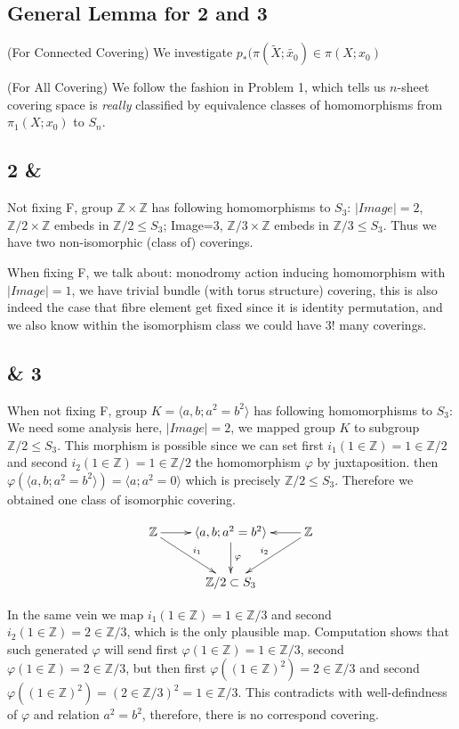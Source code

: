 \documentclass[11pt]{article}
\def\Z{{\mathbb Z}}
\theoremstyle{remark}
\begin{document}
\subsection*{General Lemma for 2 and 3}
  \indent (For Connected Covering) We investigate $p_*(\pi(\tilde{X};\tilde{x_0})\in \pi(X;x_0)$
  
  (For All Covering) We follow the fashion in Problem 1,  which tells us $n$-sheet covering space is \textit{really} classified by equivalence classes of homomorphisms from $\pi_1(X;x_0)$ to $S_n$. 
\subsection*{2 & }
    
    Not fixing F, group $\Z\times\Z$ has following homomorphisms to $S_3$: $|Image|=2$, $\Z/2\times\Z$ embeds in $\Z/2 \leq S_3$; Image=3, $\Z/3\times\Z$ embeds in $\Z/3 \leq S_3$. Thus we have two non-isomorphic (class of) coverings.  
    
    When fixing F, we talk about: monodromy action inducing homomorphism with $|Image|=1$, we have trivial bundle (with torus structure) covering, this is also indeed the case that fibre element get fixed since it is identity permutation, and we also know within the isomorphism class we could have $3!$ many coverings. 
    
\subsection*{ & 3}    
    
    When not fixing F, group $K=\langle a,b; a^2=b^2 \rangle$ has following homomorphisms to $S_3$: We need some analysis here, $|Image|=2$, we mapped group $K$ to subgroup  $\Z/2 \leq S_3$. This morphism is possible since we can set first $i_1(1\in \Z)=1\in \Z/2$ and second $i_2(1\in \Z)=1\in \Z/2$ the homomorphism $\varphi$ by juxtaposition. then $\varphi(\langle a,b; a^2=b^2 \rangle)=\langle a; a^2=0 \rangle$ which is precisely $\Z/2 \leq S_3$. Therefore we obtained one class of isomorphic covering. 
    
    \[
    \xymatrix{
    \Z \ar[r]^{}\ar[dr]^{i_1} & \langle a,b; a^2=b^2 \rangle \ar[d]^{\varphi}&  \Z \ar[l]_{} \ar[dl]_{i_2}\\
    & \Z/2 \subset S_3 &
    }
    \]
    
    In the same vein we map $i_1(1\in \Z)=1\in \Z/3$ and second $i_2(1\in \Z)=2\in \Z/3$, which is the only plausible map. Computation shows that such generated $\varphi$ will send first $\varphi(1\in \Z)=1 \in \Z/3$, second $\varphi(1\in \Z)=2 \in \Z/3$, but then first $\varphi((1\in \Z)^2)=2 \in \Z/3$ and second $\varphi((1\in \Z)^2)=(2 \in \Z/3)^2=1 \in \Z/3$. This contradicts with well-defindness of $\varphi$ and relation $a^2=b^2$, therefore, there is no correspond covering.
    
\end{document}
